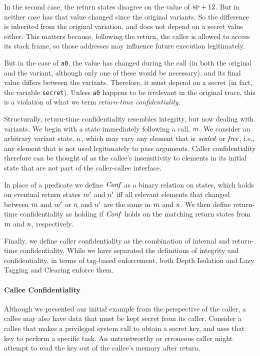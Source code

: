 \documentclass[10pt,conference]{ieeetran}%
\theoremstyle{definition}
\begin{document}
In the second case, the return states disagree on the value of \(\textsc{sp} + 12\). But in neither
case has that value changed since the original variants. So the difference is inherited from
the original variation, and does not depend on a secret value either. This matters because,
following the return, the caller is allowed to access its stack frame, so those addresses
may influence future execution legitimately.

But in the case of {\tt a0}, the value has changed during the call (in both the original
and the variant, although only one of these would be necessary), and its final value
differs between the variants.
Therefore, it must depend on a secret (in fact, the variable {\tt secret}).
Unless {\tt a0} happens to be irrelevant in the original trace, this is a violation of what
we term {\it return-time confidentiality}.

Structurally, return-time confidentiality resembles integrity, but now dealing with
variants. We begin with a state immediately following
a call, \(m\). We consider an arbitrary variant state,
\(n\), which may vary any element that is \(\mathit{sealed}\) or \(\mathit{free}\), 
i.e., any element that is not used legitimately to pass arguments. Caller confidentiality
therefore can be thought of as the callee's insensitivity to elements in its initial state
that are not part of the caller-callee interface.

In place of a predicate we define \(\mathit{Conf}\) as a binary relation on states, 
which holds on eventual return states \(m'\) and \(n'\)
iff all relevant elements that changed between \(m\) and \(m'\) or \(n\) and \(n'\)
are the same in \(m\) and \(n\). We then define
return-time confidentiality as holding if \(\mathit{Conf}\) holds on the matching return states
from \(m\) and \(n\), respectively.

Finally, we define caller confidentiality as the 
combination of internal and return-time confidentiality.
While we have separated the definitions of integrity and confidentiality,
in terms of tag-based enforcement, both Depth Isolation and Lazy Tagging and Clearing
enforce them.

\paragraph*{Callee Confidentiality}

Although we presented our initial example from the perspective of the caller, a callee
may also have data that must be kept secret from its caller. Consider a callee that makes
a privileged system call to obtain a secret key, and uses that key to perform a specific
task. An untrustworthy or erroneous caller might attempt to read the key out of the callee's
memory after return.
\end{document}
